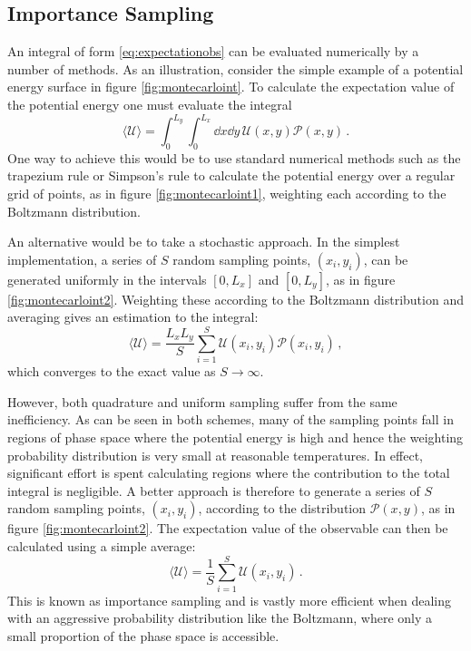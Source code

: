 \subsection{Importance Sampling}

An integral of form \eqref{eq:expectationobs} can be evaluated numerically by a number of methods.
As an illustration, consider the simple example of a \td{} potential energy surface in figure \ref{fig:montecarloint}.
To calculate the expectation value of the potential energy one must evaluate the integral
\begin{equation}
	\langle \mathcal{U} \rangle = \int_{0}^{L_y}\int_{0}^{L_x} \dd x \dd y\, \mathcal{U}\left(x,y\right)\mathcal{P}\left(x,y\right)\,.
\end{equation}
One way to achieve this would be to use standard numerical methods such as the trapezium rule or Simpson's rule to calculate the potential energy over a regular grid of points, as in figure \ref{fig:montecarloint1}, weighting each according to the Boltzmann distribution.

An alternative would be to take a stochastic approach.
In the simplest implementation, a series of $S$ random sampling points, $\left(x_i,y_i\right)$, can be generated uniformly in the intervals $\left[0,L_x\right]$ and $\left[0,L_y\right]$, as in figure \ref{fig:montecarloint2}.
Weighting these according to the Boltzmann distribution and averaging gives an estimation to the integral:
\begin{equation}
	\langle \mathcal{U} \rangle = \frac{L_xL_y}{S}\sum_{i=1}^{S} \mathcal{U}\left(x_i,y_i\right)\mathcal{P}\left(x_i,y_i\right)\,,
\end{equation}
which converges to the exact value as $S\rightarrow\infty$.

However, both quadrature and \mc{} uniform sampling suffer from the same inefficiency.
As can be seen in both schemes, many of the sampling points fall in regions of phase space where the potential energy is high and hence the weighting probability distribution is very small at reasonable temperatures.
In effect, significant effort is spent calculating regions where the contribution to the total integral is negligible.
A better approach is therefore to generate a series of $S$ random sampling points, $\left(x_i,y_i\right)$, according to the distribution $\mathcal{P}\left(x,y\right)$, as in figure \ref{fig:montecarloint2}.
The expectation value of the observable can then be calculated using a simple average:
\begin{equation}
	\langle \mathcal{U} \rangle = \frac{1}{S}\sum_{i=1}^{S} \mathcal{U}\left(x_i,y_i\right)\,.
\end{equation}
This is known as importance sampling and is vastly more efficient when dealing with an aggressive probability distribution like the Boltzmann, where only a small proportion of the phase space is accessible.

